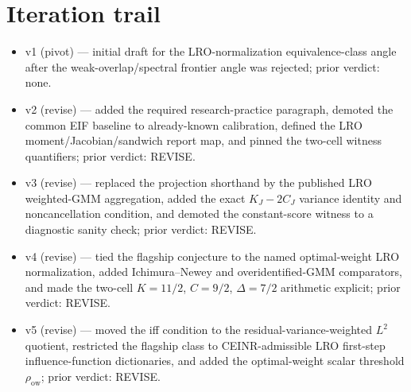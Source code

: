 \documentclass[11pt]{article}
\theoremstyle{definition}
\theoremstyle{plain}
\theoremstyle{remark}
\begin{document}
\section{Iteration trail}
\begin{itemize}[leftmargin=*]
  \item v1 (pivot) --- initial draft for the LRO-normalization equivalence-class angle after the weak-overlap/spectral frontier angle was rejected; prior verdict: none.
  \item v2 (revise) --- added the required research-practice paragraph, demoted the common EIF baseline to already-known calibration, defined the LRO moment/Jacobian/sandwich report map, and pinned the two-cell witness quantifiers; prior verdict: REVISE.
  \item v3 (revise) --- replaced the projection shorthand by the published LRO weighted-GMM aggregation, added the exact $K_J-2C_J$ variance identity and noncancellation condition, and demoted the constant-score witness to a diagnostic sanity check; prior verdict: REVISE.
  \item v4 (revise) --- tied the flagship conjecture to the named optimal-weight LRO normalization, added Ichimura--Newey and overidentified-GMM comparators, and made the two-cell $K=11/2$, $C=9/2$, $\Delta=7/2$ arithmetic explicit; prior verdict: REVISE.
  \item v5 (revise) --- moved the iff condition to the residual-variance-weighted $L^2$ quotient, restricted the flagship class to CEINR-admissible LRO first-step influence-function dictionaries, and added the optimal-weight scalar threshold $\rho_{\mathrm{ow}}$; prior verdict: REVISE.
\end{itemize}
\end{document}
